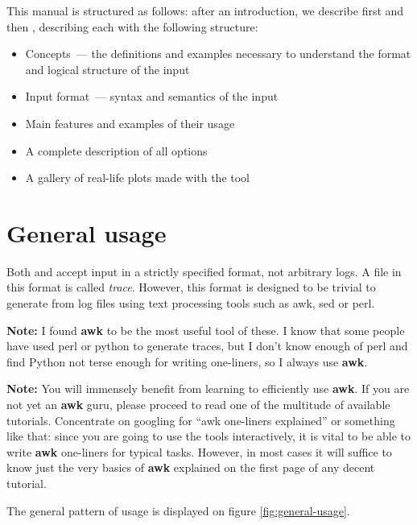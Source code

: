 \documentclass{article}
\begin{document}
This manual is structured as follows: after an introduction, we describe first \splot{} and then \timeplot{}, describing each with the following structure:

\begin{itemize}
\item Concepts~--- the definitions and examples necessary to understand the format and logical structure of the input
\item Input format~--- syntax and semantics of the input
\item Main features and examples of their usage
\item A complete description of all options
\item A gallery of real-life plots made with the tool
\end{itemize}

\section{General usage}
\label{sec:general-usage}
Both \timeplot{} and \splot{} accept input in a strictly specified format, not arbitrary logs. A file in this format is called \emph{trace}. However, this format is designed to be trivial to generate from log files using text processing tools such as awk, sed or perl.

\def\awk{\textbf{awk}}

\textbf{Note:} I found \awk{} to be the most useful tool of these. I know that some people have used perl or python to generate traces, but I don't know enough of perl and find Python not terse enough for writing one-liners, so I always use \awk{}.

\textbf{Note:} You will immensely benefit from learning to efficiently use \awk{}. If you are not yet an \awk{} guru, please proceed to read one of the multitude of available tutorials. Concentrate on googling for ``awk one-liners explained'' or something like that: since you are going to use the tools interactively, it is vital to be able to write \awk{} one-liners for typical tasks. However, in most cases it will suffice to know just the very basics of \awk{} explained on the first page of any decent tutorial.

The general pattern of usage is displayed on figure \ref{fig:general-usage}.
\end{document}
